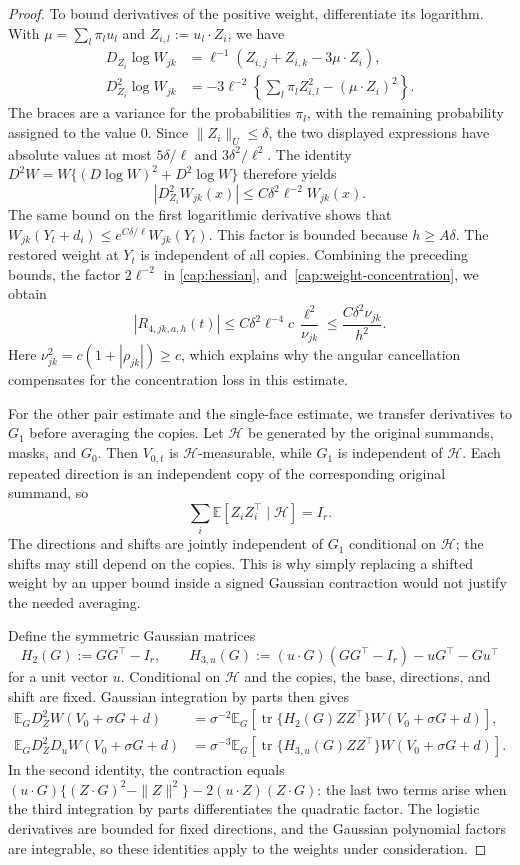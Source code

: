 \documentclass[11pt,letterpaper]{article}
\theoremstyle{remark}
\newcommand{\E}{\mathbb E}
\newcommand{\tr}{\operatorname{tr}}
\begin{document}
\begin{proof}
To bound derivatives of the positive weight, differentiate its
logarithm. With $\mu=\sum_l\pi_lu_l$ and
$Z_{i,l}:=u_l\cdot Z_i$, we have
\[
 \begin{aligned}
 D_{Z_i}\log W_{jk}
   &=\ell^{-1}(Z_{i,j}+Z_{i,k}-3\mu\cdot Z_i),\\
 D_{Z_i}^2\log W_{jk}
   &=-3\ell^{-2}\left\{\sum_l\pi_l Z_{i,l}^2
                                 -(\mu\cdot Z_i)^2\right\}.
 \end{aligned}
\]
The braces are a variance for the probabilities $\pi_l$, with
the remaining probability assigned to the value $0$.
Since $\|Z_i\|_U\le\delta$, the two displayed expressions
have absolute values at most $5\delta/\ell$ and
$3\delta^2/\ell^2$. The identity
$D^2W=W\{(D\log W)^2+D^2\log W\}$ therefore yields
\[
 |D_{Z_i}^2W_{jk}(x)|\le C\delta^2\ell^{-2}W_{jk}(x).
\]
The same bound on the first logarithmic derivative shows that
$W_{jk}(Y_t+d_i)\le e^{C\delta/\ell}W_{jk}(Y_t)$.
This factor is bounded because $h\ge A\delta$.
The restored weight at $Y_t$ is independent of all copies.
Combining the preceding bounds, the factor $2\ell^{-2}$ in
\eqref{cap:hessian}, and~\eqref{cap:weight-concentration}, we obtain
\[
 |R_{4,jk,a,h}(t)|
 \le C\delta^2\ell^{-4}c\,\frac{\ell^2}{\nu_{jk}}
 \le\frac{C\delta^2\nu_{jk}}{h^2}.
\]
Here $\nu_{jk}^2=c(1+|\rho_{jk}|)\ge c$, which explains
why the angular cancellation compensates for the concentration
loss in this estimate.

For the other pair estimate and the single-face estimate, we
transfer derivatives to $G_1$ before averaging the copies.
Let $\mathcal H$ be generated by the original summands, masks,
and $G_0$. Then $V_{0,t}$ is $\mathcal H$-measurable, while
$G_1$ is independent of $\mathcal H$. Each repeated direction
is an independent copy of the corresponding original summand,
so
\[
 \sum_i\E[Z_iZ_i^\top\mid\mathcal H]=I_r.
\]
The directions and shifts are jointly independent of $G_1$
conditional on $\mathcal H$; the shifts may still depend on
the copies. This is why simply replacing a shifted weight by
an upper bound inside a signed Gaussian contraction would not
justify the needed averaging.

Define the symmetric Gaussian matrices
\[
 H_2(G):=GG^\top-I_r,
 \qquad
 H_{3,u}(G):=(u\cdot G)(GG^\top-I_r)-uG^\top-Gu^\top
\]
for a unit vector $u$. Conditional on $\mathcal H$ and the
copies, the base, directions, and shift are fixed. Gaussian
integration by parts then gives
\begin{align*}
 \E_G D_Z^2W(V_0+\sigma G+d)
 &=\sigma^{-2}\E_G\!\left[
       \tr\{H_2(G)ZZ^\top\}W(V_0+\sigma G+d)\right],\\
 \E_G D_Z^2D_uW(V_0+\sigma G+d)
 &=\sigma^{-3}\E_G\!\left[
       \tr\{H_{3,u}(G)ZZ^\top\}W(V_0+\sigma G+d)\right].
\end{align*}
In the second identity, the contraction equals
$(u\cdot G)\{(Z\cdot G)^2-\|Z\|^2\}
 -2(u\cdot Z)(Z\cdot G)$: the last two terms arise when the
third integration by parts differentiates the quadratic factor.
The logistic derivatives are bounded for fixed directions, and
the Gaussian polynomial factors are integrable, so these
identities apply to the weights under consideration.


\end{proof}
\end{document}
